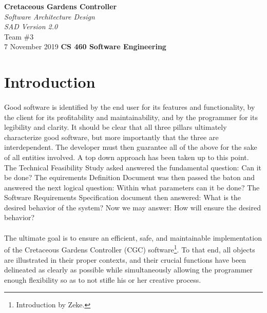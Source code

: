 \documentclass[12pt]{article}
\begin{document}
\begin{titlepage}
    \begin{flushleft}
        \vspace{1cm} \Huge  \textbf{Cretaceous Gardens Controller}\\
        \vspace{1cm} \Huge  \textit{Software Architecture Design}\\
        \vspace{1cm} \Large \textit{SAD Version 2.0}\\
        \vspace{5cm} \LARGE         Team \#3\\ 
                                    7 November 2019
        \vfill       \Huge  \textbf{CS 460 Software Engineering}
    \end{flushleft}
\end{titlepage}
\normalsize 
\tableofcontents
\pagebreak

\section{Introduction} \label{intro}
\paragraph{} Good software is identified by the end user for its features and functionality, by the client
for its profitability and maintainability, and by the programmer for its legibility and clarity. It should be clear
that all three pillars ultimately characterize good software, but more importantly that the three are interdependent.
The developer must then guarantee all of the above for the sake of all entities involved. A top down approach has been
taken up to this point. The Technical Feasibility Study asked answered the fundamental question: Can it be done? The equirements
Definition Document was then passed the baton and answered the next logical question: Within what parameters can it be done?
The Software Requirements Specification document then answered: What is the desired behavior of the system? Now we may answer: 
How will ensure the desired behavior?

\paragraph{} The ultimate goal is to ensure an efficient, safe, and maintainable implementation of the Cretaceous Gardens Controller (CGC) software\footnote{Introduction by Zeke.}. To that end, all objects are illustrated in their proper contexts, and their crucial functions have been delineated as clearly as possible while simultaneously allowing the programmer enough flexibility so as to not stifle his or her creative process. 
\end{document}
